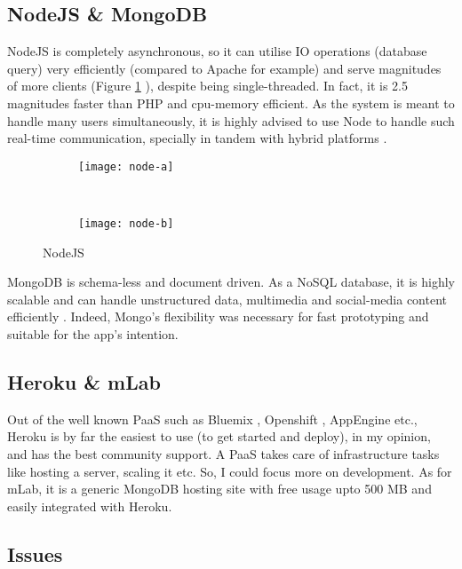 \subsection{NodeJS \& MongoDB}

NodeJS is completely asynchronous, so it can utilise IO operations (database query) very efficiently (compared to Apache for example) and serve magnitudes of more clients (Figure \ref{fig:node-comp-ex} \cite{tomislav-site}), despite being single-threaded. In fact, it is 2.5 magnitudes faster than PHP and cpu-memory efficient. As the system is meant to handle many users simultaneously, it is highly advised to use Node to handle such real-time communication, specially in tandem with hybrid platforms \cite{Chaniotis:2015}.\\

\begin{figure}[h]
    \centering
    \begin{subfigure}[b]{0.45\textwidth}
        \texttt{[image: node-a]}
    \end{subfigure}
    ~
    \begin{subfigure}[b]{0.45\textwidth}
        \texttt{[image: node-b]}
    \end{subfigure}
    \caption{NodeJS}\label{fig:node-comp-ex}
\end{figure}

MongoDB is schema-less and document driven. As a NoSQL database, it is highly scalable and can handle unstructured data, multimedia and social-media content efficiently \cite{cornelia:2015}. Indeed, Mongo's flexibility was necessary for fast prototyping and suitable for the app's intention.

\subsection{Heroku \& mLab}

Out of the well known PaaS such as Bluemix \cite{bluemix-site}, Openshift \cite{openshift-site}, AppEngine \cite{gae-site} etc., Heroku is by far the easiest to use (to get started and deploy), in my opinion, and has the best community support. A PaaS takes care of infrastructure tasks like hosting a server, scaling it etc. So, I could focus more on development. As for mLab, it is a generic MongoDB hosting site with free usage upto 500 MB and easily integrated with Heroku.

\subsection{Issues}
\label{subsec:issues}

